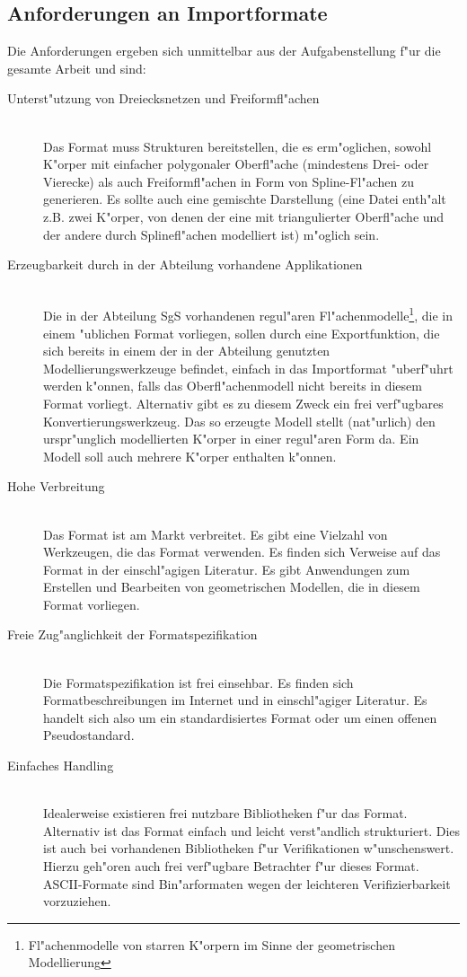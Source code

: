 \subsection{Anforderungen an Importformate}
\label{import_kriterien}
Die Anforderungen ergeben sich unmittelbar aus der Aufgabenstellung f"ur die
gesamte Arbeit und sind:
\begin{description}
\item [Unterst"utzung von Dreiecksnetzen und Freiformfl"achen] ~\\ 
    Das Format muss Strukturen bereitstellen, die es erm"oglichen, sowohl 
    K"orper mit einfacher polygonaler Oberfl"ache (mindestens Drei- oder 
    Vierecke) als auch Freiformfl"achen in Form von Spline-Fl"achen zu 
    generieren.
    Es sollte auch eine gemischte Darstellung (eine Datei enth"alt z.B. zwei
    K"orper, von denen der eine mit triangulierter Oberfl"ache und der andere 
    durch Splinefl"achen modelliert ist) m"oglich sein.
\item [Erzeugbarkeit durch in der Abteilung vorhandene Applikationen] ~\\ 
    Die in der Abteilung SgS vorhandenen regul"aren 
    Fl"achenmodelle\footnote{Fl"achenmodelle von starren K"orpern 
    im Sinne der geometrischen Modellierung}, die in einem "ublichen 
    Format vorliegen,  sollen durch eine Exportfunktion, 
    die sich bereits in einem der in der Abteilung genutzten 
    Modellierungswerkzeuge befindet, einfach in das Importformat "uberf"uhrt 
    werden k"onnen, falls das Oberfl"achenmodell nicht bereits in diesem 
    Format vorliegt. Alternativ gibt es zu diesem Zweck ein frei verf"ugbares 
    Konvertierungswerkzeug. Das so erzeugte Modell stellt (nat"urlich) den 
    urspr"unglich modellierten K"orper in einer regul"aren Form da.
    Ein Modell soll auch mehrere K"orper enthalten k"onnen.
\item [Hohe Verbreitung] ~\\ 
    Das Format ist am Markt verbreitet. Es gibt 
    eine Vielzahl von Werkzeugen, die das Format verwenden. Es finden sich 
    Verweise auf das Format in der einschl"agigen Literatur. Es gibt 
    Anwendungen zum Erstellen und Bearbeiten von geometrischen Modellen, 
    die in diesem Format vorliegen. 
\item [Freie Zug"anglichkeit der Formatspezifikation] ~\\ 
    Die Formatspezifikation ist frei einsehbar. Es finden sich 
    Formatbeschreibungen im Internet und in einschl"agiger Literatur.
    Es handelt sich also um ein standardisiertes Format oder um einen offenen
    Pseudostandard.
\item [Einfaches Handling] ~\\ 
    Idealerweise existieren frei nutzbare Bibliotheken f"ur das Format. 
    Alternativ ist das Format einfach und leicht verst"andlich strukturiert. 
    Dies ist auch bei vorhandenen Bibliotheken f"ur Verifikationen
    w"unschenswert. Hierzu geh"oren auch frei verf"ugbare Betrachter f"ur 
    dieses Format. ASCII-Formate sind Bin"arformaten wegen der leichteren 
    Verifizierbarkeit vorzuziehen.
\end{description}
